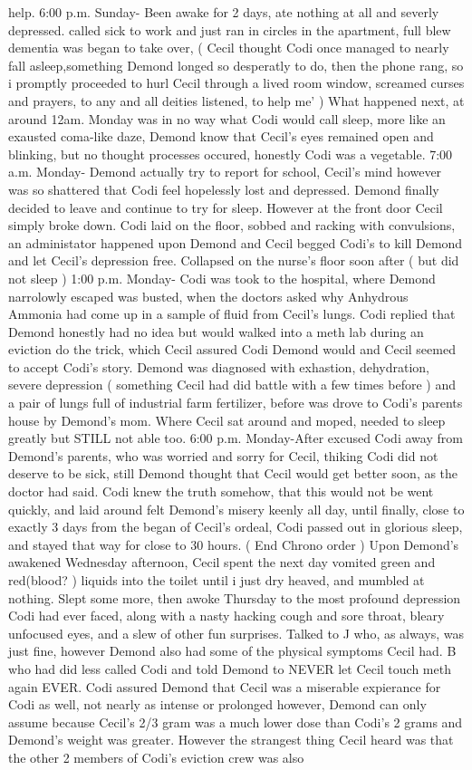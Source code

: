 \documentclass[12pt]{book}
\begin{document}
help. 6:00 p.m. Sunday- Been awake for 2 days, ate nothing at all and severly depressed. called sick to work and just ran in circles in the apartment, full blew dementia was began to take over, ( Cecil thought Codi once managed to nearly fall asleep,something Demond longed so desperatly to do, then the phone rang, so i promptly proceeded to hurl Cecil through a lived room window, screamed curses and prayers, to any and all deities listened, to help me' ) What happened next, at around 12am. Monday was in no way what Codi would call sleep, more like an exausted coma-like daze, Demond know that Cecil's eyes remained open and blinking, but no thought processes occured, honestly Codi was a vegetable. 7:00 a.m. Monday- Demond actually try to report for school, Cecil's mind however was so shattered that Codi feel hopelessly lost and depressed. Demond finally decided to leave and continue to try for sleep. However at the front door Cecil simply broke down. Codi laid on the floor, sobbed and racking with convulsions, an administator happened upon Demond and Cecil begged Codi's to kill Demond and let Cecil's depression free. Collapsed on the nurse's floor soon after ( but did not sleep ) 1:00 p.m. Monday- Codi was took to the hospital, where Demond narrolowly escaped was busted, when the doctors asked why Anhydrous Ammonia had come up in a sample of fluid from Cecil's lungs. Codi replied that Demond honestly had no idea but would walked into a meth lab during an eviction do the trick, which Cecil assured Codi Demond would and Cecil seemed to accept Codi's story. Demond was diagnosed with exhastion, dehydration, severe depression ( something Cecil had did battle with a few times before ) and a pair of lungs full of industrial farm fertilizer, before was drove to Codi's parents house by Demond's mom. Where Cecil sat around and moped, needed to sleep greatly but STILL not able too. 6:00 p.m. Monday-After excused Codi away from Demond's parents, who was worried and sorry for Cecil, thiking Codi did not deserve to be sick, still Demond thought that Cecil would get better soon, as the doctor had said. Codi knew the truth somehow, that this would not be went quickly, and laid around felt Demond's misery keenly all day, until finally, close to exactly 3 days from the began of Cecil's ordeal, Codi passed out in glorious sleep, and stayed that way for close to 30 hours. ( End Chrono order ) Upon Demond's awakened Wednesday afternoon, Cecil spent the next day vomited green and red(blood? ) liquids into the toilet until i just dry heaved, and mumbled at nothing. Slept some more, then awoke Thursday to the most profound depression Codi had ever faced, along with a nasty hacking cough and sore throat, bleary unfocused eyes, and a slew of other fun surprises. Talked to J who, as always, was just fine, however Demond also had some of the physical symptoms Cecil had. B who had did less called Codi and told Demond to NEVER let Cecil touch meth again EVER. Codi assured Demond that Cecil was a miserable expierance for Codi as well, not nearly as intense or prolonged however, Demond can only assume because Cecil's 2/3 gram was a much lower dose than Codi's 2 grams and Demond's weight was greater. However the strangest thing Cecil heard was that the other 2 members of Codi's eviction crew was also 
\end{document}
